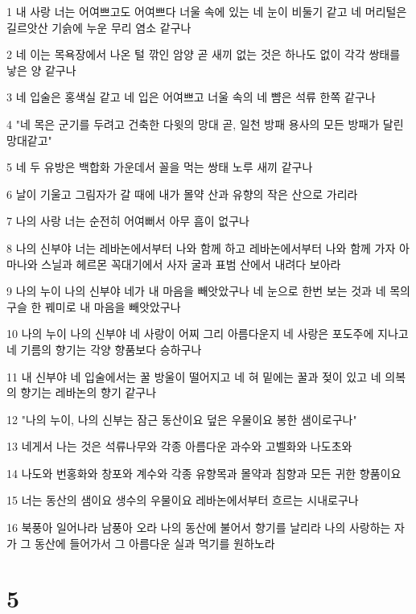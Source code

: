 \par 1 내 사랑 너는 어여쁘고도 어여쁘다 너울 속에 있는 네 눈이 비둘기 같고 네 머리털은 길르앗산 기슭에 누운 무리 염소 같구나
\par 2 네 이는 목욕장에서 나온 털 깎인 암양 곧 새끼 없는 것은 하나도 없이 각각 쌍태를 낳은 양 같구나
\par 3 네 입술은 홍색실 같고 네 입은 어여쁘고 너울 속의 네 뺨은 석류 한쪽 같구나
\par 4 "네 목은 군기를 두려고 건축한 다윗의 망대 곧, 일천 방패 용사의 모든 방패가 달린 망대같고"
\par 5 네 두 유방은 백합화 가운데서 꼴을 먹는 쌍태 노루 새끼 같구나
\par 6 날이 기울고 그림자가 갈 때에 내가 몰약 산과 유향의 작은 산으로 가리라
\par 7 나의 사랑 너는 순전히 어여뻐서 아무 흠이 없구나
\par 8 나의 신부야 너는 레바논에서부터 나와 함께 하고 레바논에서부터 나와 함께 가자 아마나와 스닐과 헤르몬 꼭대기에서 사자 굴과 표범 산에서 내려다 보아라
\par 9 나의 누이 나의 신부야 네가 내 마음을 빼앗았구나 네 눈으로 한번 보는 것과 네 목의 구슬 한 꿰미로 내 마음을 빼앗았구나
\par 10 나의 누이 나의 신부야 네 사랑이 어찌 그리 아름다운지 네 사랑은 포도주에 지나고 네 기름의 향기는 각양 향품보다 승하구나
\par 11 내 신부야 네 입술에서는 꿀 방울이 떨어지고 네 혀 밑에는 꿀과 젖이 있고 네 의복의 향기는 레바논의 향기 같구나
\par 12 "나의 누이, 나의 신부는 잠근 동산이요 덮은 우물이요 봉한 샘이로구나"
\par 13 네게서 나는 것은 석류나무와 각종 아름다운 과수와 고벨화와 나도초와
\par 14 나도와 번홍화와 창포와 계수와 각종 유향목과 몰약과 침향과 모든 귀한 향품이요
\par 15 너는 동산의 샘이요 생수의 우물이요 레바논에서부터 흐르는 시내로구나
\par 16 북풍아 일어나라 남풍아 오라 나의 동산에 불어서 향기를 날리라 나의 사랑하는 자가 그 동산에 들어가서 그 아름다운 실과 먹기를 원하노라

\chapter{5}

